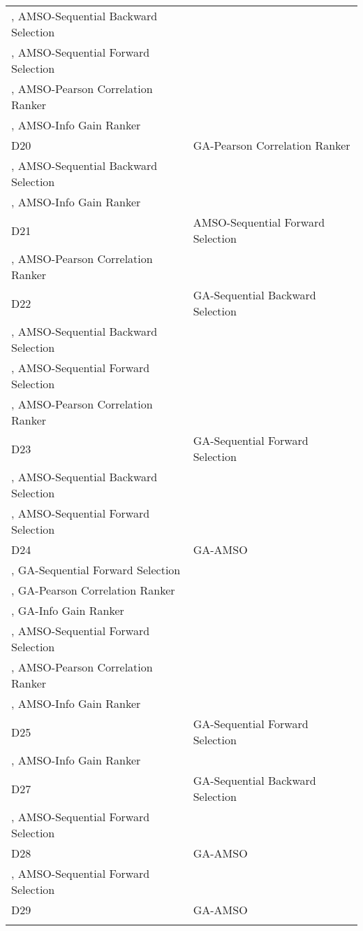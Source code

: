 \begin{table}
\begin{tabular}{ll}
, AMSO-Sequential Backward Selection\\
, AMSO-Sequential Forward Selection\\
, AMSO-Pearson Correlation Ranker\\
, AMSO-Info Gain Ranker\\
D20&GA-Pearson Correlation Ranker\\
, AMSO-Sequential Backward Selection\\
, AMSO-Info Gain Ranker\\
D21&AMSO-Sequential Forward Selection\\
, AMSO-Pearson Correlation Ranker\\
D22&GA-Sequential Backward Selection\\
, AMSO-Sequential Backward Selection\\
, AMSO-Sequential Forward Selection\\
, AMSO-Pearson Correlation Ranker\\
D23&GA-Sequential Forward Selection\\
, AMSO-Sequential Backward Selection\\
, AMSO-Sequential Forward Selection\\
D24&GA-AMSO\\
, GA-Sequential Forward Selection\\
, GA-Pearson Correlation Ranker\\
, GA-Info Gain Ranker\\
, AMSO-Sequential Forward Selection\\
, AMSO-Pearson Correlation Ranker\\
, AMSO-Info Gain Ranker\\
D25&GA-Sequential Forward Selection\\
, AMSO-Info Gain Ranker\\
D27&GA-Sequential Backward Selection\\
, AMSO-Sequential Forward Selection\\
D28&GA-AMSO\\
, AMSO-Sequential Forward Selection\\
D29&GA-AMSO\\
\noalign{\smallskip}\hline
\end{tabular}
\end{table}
